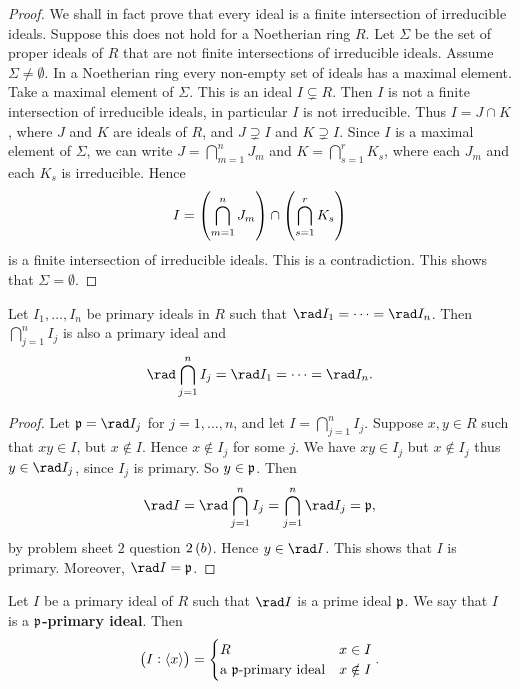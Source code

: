 \begin{proof}
We shall in fact prove that every ideal is a finite intersection of irreducible ideals. Suppose this does not hold for a Noetherian ring $ R $. Let $ \Sigma $ be the set of proper ideals of $ R $ that are not finite intersections of irreducible ideals. Assume $ \Sigma \ne \emptyset $. In a Noetherian ring every non-empty set of ideals has a maximal element. Take a maximal element of $ \Sigma $. This is an ideal $ I \subsetneq R $. Then $ I $ is not a finite intersection of irreducible ideals, in particular $ I $ is not irreducible. Thus $ I = J \cap K $, where $ J $ and $ K $ are ideals of $ R $, and $ J \supsetneq I $ and $ K \supsetneq I $. Since $ I $ is a maximal element of $ \Sigma $, we can write $ J = \bigcap_{m = 1}^n J_m $ and $ K = \bigcap_{s = 1}^r K_s $, where each $ J_m $ and each $ K_s $ is irreducible. Hence
$$ I = \br{\bigcap_{m = 1}^n J_m} \cap \br{\bigcap_{s = 1}^r K_s} $$
is a finite intersection of irreducible ideals. This is a contradiction. This shows that $ \Sigma = \emptyset $.
\end{proof}

\begin{lemma}
\label{lem:12.7}
Let $ I_1, \dots, I_n $ be primary ideals in $ R $ such that $ \rad I_1 = \dots = \rad I_n $. Then $ \bigcap_{j = 1}^n I_j $ is also a primary ideal and
$$ \rad \bigcap_{j = 1}^n I_j = \rad I_1 = \dots = \rad I_n. $$
\end{lemma}

\begin{proof}
Let $ \ppp = \rad I_j $ for $ j = 1, \dots, n $, and let $ I = \bigcap_{j = 1}^n I_j $. Suppose $ x, y \in R $ such that $ xy \in I $, but $ x \notin I $. Hence $ x \notin I_j $ for some $ j $. We have $ xy \in I_j $ but $ x \notin I_j $ thus $ y \in \rad I_j $, since $ I_j $ is primary. So $ y \in \mathfrak{p} $. Then
$$ \rad I = \rad \bigcap_{j = 1}^n I_j = \bigcap_{j = 1}^n \rad I_j = \ppp, $$
by problem sheet $ 2 $ question $ 2\br{b} $. Hence $ y \in \rad I $. This shows that $ I $ is primary. Moreover, $ \rad I = \ppp $.
\end{proof}

\begin{lemma}
\label{lem:12.8}
Let $ I $ be a primary ideal of $ R $ such that $ \rad I $ is a prime ideal $ \mathfrak{p} $. We say that $ I $ is a \textbf{$ \mathfrak{p} $-primary ideal}. Then
$$ \br{I : \abr{x}} =
\begin{cases}
R & x \in I \\
\text{a $ \ppp $-primary ideal} & x \notin I
\end{cases}.
$$
\end{lemma}

